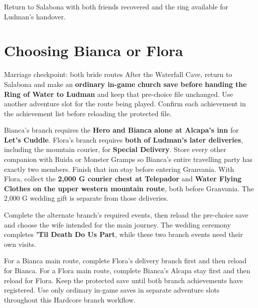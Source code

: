 Return to Salabona with both friends recovered and the ring available
for Ludman's handover.

\section{Choosing Bianca or Flora}

\begin{achievementsetup}{Marriage checkpoint: both bride routes}
After the Waterfall Cave, return to Salabona and make an
\textbf{ordinary in-game church save before handing the Ring of Water to Ludman}
and keep that pre-choice file unchanged. Use another adventure slot for
the route being played. Confirm each achievement in the achievement list
before reloading the protected file.

Bianca's branch requires the \textbf{Hero and Bianca alone at Alcapa's inn}
for \textbf{Let's Cuddle}. Flora's branch requires \textbf{both of Ludman's
later deliveries}, including the mountain courier, for
\textbf{Special Delivery}. Store every other companion with Ruida or
Monster Gramps so Bianca's entire travelling party has exactly two members.
Finish that inn stay before entering Granvania. With Flora, collect the
\textbf{2,000 G courier chest at Telepador} and \textbf{Water Flying Clothes
on the upper western mountain route}, both before Granvania. The 2,000 G
wedding gift is separate from those deliveries.

Complete the alternate branch's required events,
then reload the pre-choice save and choose the wife intended for the main
journey. The wedding ceremony completes \textbf{'Til Death Do Us Part}, while these
two branch events need their own visits.

For a Bianca main route, complete Flora's delivery branch first and then
reload for Bianca. For a Flora main route, complete Bianca's Alcapa stay
first and then reload for Flora. Keep the protected save until both branch
achievements have registered.
Use only ordinary in-game saves in separate adventure slots throughout
this Hardcore branch workflow.
\end{achievementsetup}



